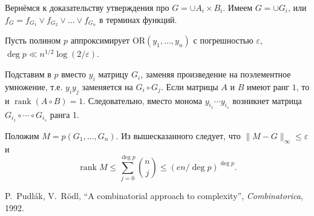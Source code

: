 \documentclass{beamer}
\renewcommand\le{\leqslant}
\newcommand\eps{\varepsilon}
\DeclareMathOperator{\rank}{rank}
\begin{document}
\begin{frame}
    Вернёмся к доказательству утверждения про $G=\cup A_i\times B_i$. Имеем
    $G=\cup G_i$, или $f_G=f_{G_1}\vee f_{G_2}\vee\ldots\vee f_{G_n}$ в терминах
    функций.
    \pause\vspace{5pt}

    Пусть полином $p$ аппроксимирует $\mathrm{OR}(y_1,\ldots,y_n)$ с
    погрешностью $\eps$, $\deg p\ll n^{1/2}\log(2/\eps)$.
    \pause\vspace{5pt}

    Подставим в $p$ вместо $y_i$ матрицу $G_i$, заменяя произведение на
    поэлементное умножение, т.е. $y_iy_j$ заменяется на $G_i\circ G_j$. Если
    матрицы $A$ и $B$ имеют ранг $1$, то и $\rank(A\circ B)=1$. Следовательно,
    вместо монома $y_{i_1}\cdots y_{i_s}$ возникнет матрица $G_{i_1}\circ\cdots\circ
    G_{i_s}$ ранга 1.
    \pause\vspace{5pt}

    Положим $M=p(G_1,\ldots,G_n)$. Из вышесказанного следует, что
    $\|M-G\|_\infty\le\eps$ и
    $$
    \rank M \le \sum_{j=0}^{\deg p} \binom{n}{j} \le (en/\deg p)^{\deg p}.
    $$
\end{frame}


\begin{frame}
    \begin{thebibliography}{XXXX}
         P.~Pudl\'ak, V.~R\"odl, ``A combinatorial approach to
            complexity'', \textit{Combinatorica}, 1992.
    \end{thebibliography}
\end{frame}
\end{document}
